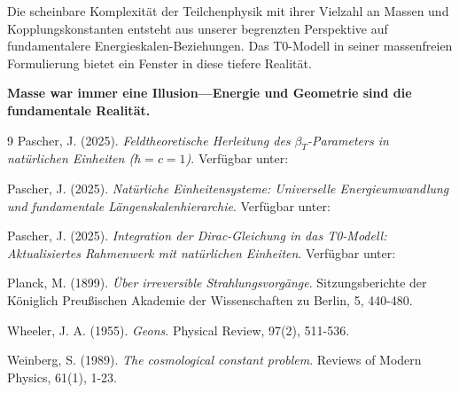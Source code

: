 	Die scheinbare Komplexität der Teilchenphysik mit ihrer Vielzahl an Massen und Kopplungskonstanten entsteht aus unserer begrenzten Perspektive auf fundamentalere Energieskalen-Beziehungen. Das T0-Modell in seiner massenfreien Formulierung bietet ein Fenster in diese tiefere Realität.
	
	\textbf{Masse war immer eine Illusion—Energie und Geometrie sind die fundamentale Realität.}
	
	\begin{thebibliography}{9}
		Pascher, J. (2025). \textit{Feldtheoretische Herleitung des $\beta_T$-Parameters in natürlichen Einheiten ($\hbar = c = 1$)}. Verfügbar unter: 
		
		Pascher, J. (2025). \textit{Natürliche Einheitensysteme: Universelle Energieumwandlung und fundamentale Längenskalenhierarchie}. Verfügbar unter: 
		
		Pascher, J. (2025). \textit{Integration der Dirac-Gleichung in das T0-Modell: Aktualisiertes Rahmenwerk mit natürlichen Einheiten}. Verfügbar unter: 
		
		Planck, M. (1899). \textit{Über irreversible Strahlungsvorgänge}. Sitzungsberichte der Königlich Preußischen Akademie der Wissenschaften zu Berlin, 5, 440-480.
		
		Wheeler, J. A. (1955). \textit{Geons}. Physical Review, 97(2), 511-536.
		
		Weinberg, S. (1989). \textit{The cosmological constant problem}. Reviews of Modern Physics, 61(1), 1-23.
	\end{thebibliography}
	